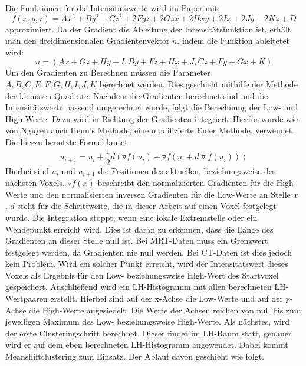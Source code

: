 Die Funktionen für die Intensitätswerte wird im Paper mit:
\begin{equation}
	f(x,y,z) = Ax^{2}+By^{2}+Cz^{2}+2Fyz+2Gzx+2Hxy+2Ix+2Jy+2Kz+D
\end{equation}
approximiert. Da der Gradient die Ableitung der Intensitätsfunktion ist, erhält man den dreidimensionalen Gradientenvektor $n$, indem die Funktion ableitetet wird:
\begin{equation}
	n = (Ax+Gz+Hy+I, By+Fz+Hx+J, Cz + Fy + Gx + K)
\end{equation}
Um den Gradienten zu Berechnen müssen die Parameter $A,B,C,E,F,G,H,I,J,K$  berechnet werden. Dies geschieht mithilfe der Methode der kleinsten Quadrate.
\newline
Nachdem die Gradienten berechnet sind und die Intensitätswerte passend umgerechnet wurde, folgt die Berechnung der Low- und High-Werte. Dazu wird in Richtung der Gradienten integriert. Hierfür wurde wie von Nguyen auch Heun's Methode, eine modifizierte Euler Methode, verwendet. Die hierzu benutzte Formel lautet:
\begin{equation}
	u_{i+1} = u_{i} + \frac{1}{2}d(\triangledown f (u_{i}) + \triangledown f(u_{i}+d \triangledown f(u_{i}))) 
\end{equation}
Hierbei sind $u_{i}$ und $u_{i+1}$ die Positionen des aktuellen, beziehungsweise des nächsten Voxels. $\triangledown f(x)$ beschreibt den normalisierten Gradienten für die High-Werte und den normalisierten inversen Gradienten für die Low-Werte an Stelle $x$ . $d$ steht für die Schrittweite, die in dieser Arbeit auf einen Voxel festgelegt wurde.
Die Integration stoppt, wenn eine lokale Extremstelle oder ein Wendepunkt erreicht wird. Dies ist daran zu erkennen, dass die Länge des Gradienten an dieser Stelle null ist. Bei MRT-Daten muss ein Grenzwert festgelegt werden, da Gradienten nie null werden. Bei CT-Daten ist dies jedoch kein Problem. Wird ein solcher Punkt erreicht, wird der Intensitätswert dieses Voxels als Ergebnis für den Low- beziehungsweise High-Wert des Startvoxel gespeichert.
\newline
Anschließend wird ein LH-Histogramm mit allen berechneten LH-Wertpaaren erstellt. Hierbei sind auf der x-Achse die Low-Werte und auf der y-Achse die High-Werte angesiedelt. Die Werte der Achsen reichen von null bis zum jeweiligen Maximum des Low- beziehungsweise High-Werte.
\newline
{}
Als nächstes, wird der erste Clusteringschritt berechnet. Dieser findet im LH-Raum statt, genauer wird er auf dem eben berechneten LH-Histogramm angewendet. Dabei kommt Meanshiftclustering zum Einsatz. Der Ablauf davon geschieht wie folgt.
